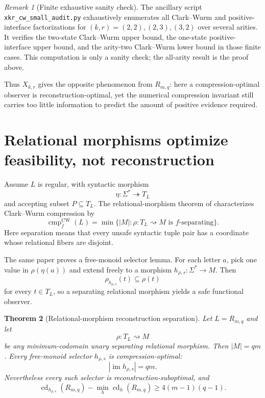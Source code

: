 \documentclass[11pt]{article}
\newtheorem{theorem}{Theorem}[section]
\theoremstyle{definition}
\theoremstyle{remark}
\newtheorem{remark}[theorem]{Remark}
\newcommand{\im}{\operatorname{im}}
\newcommand{\cmp}{\operatorname{cmp}}
\newcommand{\cd}{\operatorname{cd}}
\newcommand{\relto}{\mathrel{\rightsquigarrow}}
\begin{document}
\begin{remark}[Finite exhaustive sanity check]
The ancillary script \texttt{xkr\_cw\_small\_audit.py} exhaustively enumerates
all Clark--Wurm and positive-interface factorizations for
$(k,r)=(2,2),(2,3),(3,2)$ over several arities.  It verifies the two-state
Clark--Wurm upper bound, the one-state positive-interface upper bound, and the
arity-two Clark--Wurm lower bound in those finite cases.  This computation is
only a sanity check; the all-arity result is the proof above.
\end{remark}

Thus $X_{k,r}$ gives the opposite phenomenon from $R_{m,q}$: here a
compression-optimal observer is reconstruction-optimal, yet the numerical
compression invariant still carries too little information to predict the
amount of positive evidence required.

\section{Relational morphisms optimize feasibility, not reconstruction}
\label{sec:relational}

Assume $L$ is regular, with syntactic morphism
\[
 \eta:\Sigma^*\twoheadrightarrow T_L
\]
and accepting subset $P\subseteq T_L$.  The relational-morphism theorem of
\cite{KuriyamaSCL} characterizes Clark--Wurm compression by
\[
 \cmp_f^{\mathrm{CW}}(L)
 =
 \min\{|M|:\rho:T_L\relto M\text{ is $f$-separating}\}.
\]
Here separation means that every unsafe syntactic tuple pair has a coordinate
whose relational fibers are disjoint.

The same paper proves a free-monoid selector lemma.  For each letter $a$, pick
one value in $\rho(\eta(a))$ and extend freely to a morphism
$h_{\rho,s}:\Sigma^*\to M$.  Then
\[
 \rho_{h_{\rho,s}}(t)\subseteq\rho(t)
\]
for every $t\in T_L$, so a separating relational morphism yields a safe
functional observer.

\begin{theorem}[Relational-morphism reconstruction separation]
\label{thm:relational-separation}
Let $L=R_{m,q}$ and let
\[
 \rho:T_L\relto M
\]
be any minimum-codomain unary separating relational morphism.  Then
$|M|=qm$.  Every free-monoid selector $h_{\rho,s}$ is compression-optimal:
\[
 |\im h_{\rho,s}|=qm.
\]
Nevertheless every such selector is reconstruction-suboptimal, and
\[
 \boxed{
 \cd_{h_{\rho,s}}(R_{m,q})
 -
 \min_h\cd_h(R_{m,q})
 \ge4(m-1)(q-1).
 }
\]
\end{theorem}
\end{document}
